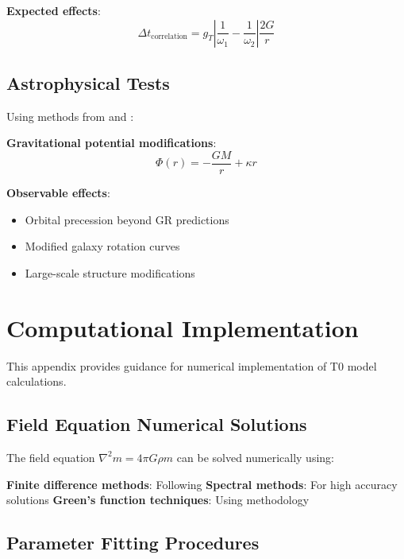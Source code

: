 \documentclass[12pt,a4paper]{article}
\begin{document}
	\textbf{Expected effects}:
	\begin{equation}
		\Delta t_{\text{correlation}} = g_T \left|\frac{1}{\omega_1} - \frac{1}{\omega_2}\right| \frac{2G}{r}
	\end{equation}
	
	\subsection{Astrophysical Tests}
	\label{app:astrophysical_tests}
	
	Using methods from \citet{will2014} and \citet{binney2008}:
	
	\textbf{Gravitational potential modifications}:
	\begin{equation}
		\Phi(r) = -\frac{GM}{r} + \kappa r
	\end{equation}
	
	\textbf{Observable effects}:
	\begin{itemize}
		\item Orbital precession beyond GR predictions
		\item Modified galaxy rotation curves
		\item Large-scale structure modifications
	\end{itemize}
	
	\section{Computational Implementation}
	\label{app:computational}
	
	This appendix provides guidance for numerical implementation of T0 model calculations.
	
	\subsection{Field Equation Numerical Solutions}
	\label{app:numerical_solutions}
	
	The field equation $\nabla^2 m = 4\pi G \rho m$ can be solved numerically using:
	
	\textbf{Finite difference methods}: Following \citet{haberman2004}
	\textbf{Spectral methods}: For high accuracy solutions
	\textbf{Green's function techniques}: Using \citet{duffy2001} methodology
	
	\subsection{Parameter Fitting Procedures}
	\label{app:parameter_fitting}
	
\end{document}
